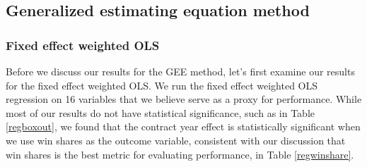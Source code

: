 \documentclass[12pt]{article}
\begin{document}
	\subsection{Generalized estimating equation method}
	
	\subsubsection{Fixed effect weighted OLS}
	
	Before we discuss our results for the GEE method, let's first examine our results for the fixed effect weighted OLS. We run the fixed effect weighted OLS regression on 16 variables that we believe serve as a proxy for performance. While most of our results do not have statistical significance, such as in Table \ref{regboxout}, we found that the contract year effect is statistically significant when we use win shares as the outcome variable, consistent with our discussion that win shares is the best metric for evaluating performance, in Table \ref{regwinshare}.
	
\end{document}
